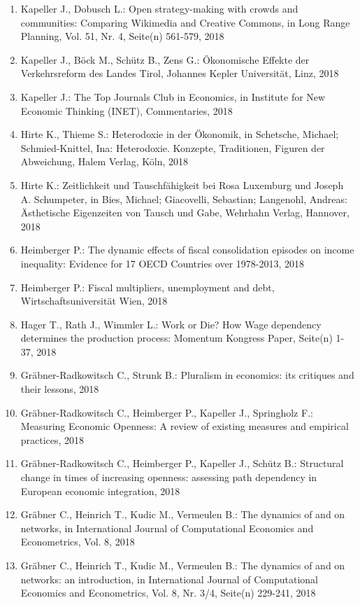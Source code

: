\begin{enumerate}
	 \item Kapeller J., Dobusch L.: Open strategy-making with crowds and communities: Comparing Wikimedia and Creative Commons, in Long Range Planning, Vol. 51, Nr. 4, Seite(n) 561-579, 2018
	 \item Kapeller J., Böck M., Schütz B., Zens G.: Ökonomische Effekte der Verkehrsreform des Landes Tirol, Johannes Kepler Universität, Linz, 2018
	 \item Kapeller J.: The Top Journals Club in Economics, in Institute for New Economic Thinking (INET), Commentaries, 2018
	 \item Hirte K., Thieme S.: Heterodoxie in der Ökonomik, in Schetsche, Michael; Schmied-Knittel, Ina: Heterodoxie. Konzepte, Traditionen, Figuren der Abweichung, Halem Verlag, Köln, 2018
	 \item Hirte K.: Zeitlichkeit und Tauschfähigkeit bei Rosa Luxemburg und Joseph A. Schumpeter, in Bies, Michael; Giacovelli, Sebastian; Langenohl, Andreas: Ästhetische Eigenzeiten von Tausch und Gabe, Wehrhahn Verlag, Hannover, 2018
	 \item Heimberger P.: The dynamic effects of fiscal consolidation episodes on income inequality: Evidence for 17 OECD Countries over 1978-2013, 2018
	 \item Heimberger P.: Fiscal multipliers, unemployment and debt, Wirtschaftsuniversität Wien, 2018
	 \item Hager T., Rath J., Wimmler L.: Work or Die? How Wage dependency determines the production process: Momentum Kongress Paper, Seite(n) 1-37, 2018
	 \item Gräbner-Radkowitsch C., Strunk B.: Pluralism in economics: its critiques and their lessons, 2018
	 \item Gräbner-Radkowitsch C., Heimberger P., Kapeller J., Springholz F.: Measuring Economic Openness: A review of existing measures and empirical practices, 2018
	 \item Gräbner-Radkowitsch C., Heimberger P., Kapeller J., Schütz B.: Structural change in times of increasing openness: assessing path dependency in European economic integration, 2018
	 \item Gräbner C., Heinrich T., Kudic M., Vermeulen B.: The dynamics of and on networks, in International Journal of Computational Economics and Econometrics, Vol. 8, 2018
	 \item Gräbner C., Heinrich T., Kudic M., Vermeulen B.: The dynamics of and on networks: an introduction, in International Journal of Computational Economics and Econometrics, Vol. 8, Nr. 3/4, Seite(n) 229-241, 2018

\end{enumerate}
